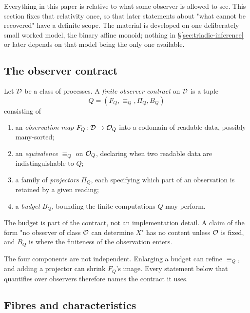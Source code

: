 \label{sec:observers-body}

Everything in this paper is relative to what some observer is allowed to see.  This
section fixes that relativity once, so that later statements about "what cannot be
recovered" have a definite scope.  The material is developed on one deliberately
small worked model, the binary affine monoid; nothing in \S\ref{sec:triadic-inference}
or later depends on that model being the only one available.

\subsection{The observer contract}

\begin{definition}\label{def:observer-contract}
Let $\mathcal D$ be a class of processes.  A \emph{finite observer contract} on $\mathcal D$ is a
tuple
\[
  Q=(F_Q,\equiv_Q,\Pi_Q,B_Q)
\]
consisting of
\begin{enumerate}
\item an \emph{observation map} $F_Q\colon\mathcal D\to\mathcal O_Q$ into a codomain of readable
  data, possibly many-sorted;
\item an \emph{equivalence} $\equiv_Q$ on $\mathcal O_Q$, declaring when two readable data
  are indistinguishable to $Q$;
\item a family of \emph{projectors} $\Pi_Q$, each specifying which part of an
  observation is retained by a given reading;
\item a \emph{budget} $B_Q$, bounding the finite computations $Q$ may perform.
\end{enumerate}
\end{definition}

The budget is part of the contract, not an implementation detail.  A claim of the
form "no observer of class $\mathcal O$ can determine $X$" has no content unless $\mathcal O$ is
fixed, and $B_Q$ is where the finiteness of the observation enters.

\begin{remark}
The four components are not independent.  Enlarging a budget can refine
$\equiv_Q$, and adding a projector can shrink $F_Q$'s image.  Every statement below
that quantifies over observers therefore names the contract it uses.
\end{remark}

\subsection{Fibres and characteristics}

